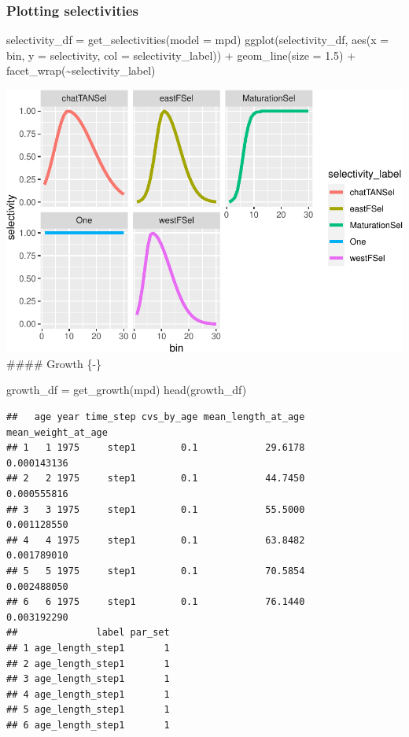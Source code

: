 \documentclass[
]{book}
\newenvironment{Shaded}{\begin{snugshade}}{\end{snugshade}}
\newcommand{\AttributeTok}[1]{\textcolor[rgb]{0.77,0.63,0.00}{#1}}
\newcommand{\FloatTok}[1]{\textcolor[rgb]{0.00,0.00,0.81}{#1}}
\newcommand{\FunctionTok}[1]{\textcolor[rgb]{0.00,0.00,0.00}{#1}}
\newcommand{\NormalTok}[1]{#1}
\newcommand{\OtherTok}[1]{\textcolor[rgb]{0.56,0.35,0.01}{#1}}
\newcommand{\SpecialCharTok}[1]{\textcolor[rgb]{0.00,0.00,0.00}{#1}}
\begin{document}
\hypertarget{plotting-selectivities}{%
\subsubsection{Plotting selectivities}\label{plotting-selectivities}}

\begin{Shaded}
\begin{Highlighting}[]
\NormalTok{selectivity\_df }\OtherTok{=} \FunctionTok{get\_selectivities}\NormalTok{(}\AttributeTok{model =}\NormalTok{ mpd)}
\FunctionTok{ggplot}\NormalTok{(selectivity\_df, }\FunctionTok{aes}\NormalTok{(}\AttributeTok{x =}\NormalTok{ bin, }\AttributeTok{y =}\NormalTok{ selectivity, }\AttributeTok{col =}\NormalTok{ selectivity\_label)) }\SpecialCharTok{+}
  \FunctionTok{geom\_line}\NormalTok{(}\AttributeTok{size =} \FloatTok{1.5}\NormalTok{) }\SpecialCharTok{+}
  \FunctionTok{facet\_wrap}\NormalTok{(}\SpecialCharTok{\textasciitilde{}}\NormalTok{selectivity\_label)}
\end{Highlighting}
\end{Shaded}

\includegraphics{_main_files/figure-latex/selectivities_mpd-1.pdf}
\#\#\#\# Growth \{-\}

\begin{Shaded}
\begin{Highlighting}[]
\NormalTok{growth\_df }\OtherTok{=} \FunctionTok{get\_growth}\NormalTok{(mpd)}
\FunctionTok{head}\NormalTok{(growth\_df)}
\end{Highlighting}
\end{Shaded}

\begin{verbatim}
##   age year time_step cvs_by_age mean_length_at_age mean_weight_at_age
## 1   1 1975     step1        0.1            29.6178        0.000143136
## 2   2 1975     step1        0.1            44.7450        0.000555816
## 3   3 1975     step1        0.1            55.5000        0.001128550
## 4   4 1975     step1        0.1            63.8482        0.001789010
## 5   5 1975     step1        0.1            70.5854        0.002488050
## 6   6 1975     step1        0.1            76.1440        0.003192290
##              label par_set
## 1 age_length_step1       1
## 2 age_length_step1       1
## 3 age_length_step1       1
## 4 age_length_step1       1
## 5 age_length_step1       1
## 6 age_length_step1       1
\end{verbatim}
\end{document}
